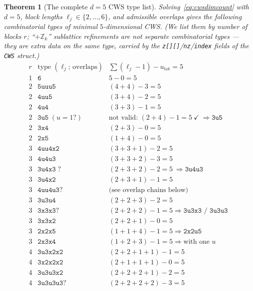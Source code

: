 \documentclass{amsart}
\newtheorem{theorem}{Theorem}[section]
\begin{document}
\begin{theorem}[The complete $d=5$ CWS type list]\label{thm:cws5types}
Solving~\eqref{eq:cwsdimcount} with $d=5$, block lengths
$\ell_j\in\{2,\dots,6\}$, and admissible overlaps gives the following
combinatorial types of minimal $5$-dimensional CWS. (We list them by number of
blocks $r$; ``$+\mathbb{Z}_k$'' sublattice refinements are \emph{not} separate
combinatorial types --- they are extra data on the same type, carried by the
\texttt{z[][]}/\texttt{nz}/\texttt{index} fields of the \texttt{CWS} struct.)
\[
\begin{array}{lll}
r & \text{type } (\ell_j;\,\text{overlaps}) & \sum(\ell_j{-}1)-u_{\mathrm{tot}}=5\\\hline
1 & \texttt{6}        & 5-0=5\\[2pt]
2 & \texttt{5uuu5}    & (4{+}4)-3=5\\
2 & \texttt{4uu5}     & (3{+}4)-2=5\\
2 & \texttt{4u4}      & (3{+}3)-1=5\\
2 & \texttt{3u5}\;(u{=}1?) & \text{not valid: }(2{+}4)-1=5\ \checkmark\ \Rightarrow \texttt{3u5}\\
2 & \texttt{3x4}      & (2{+}3)-0=5\\
2 & \texttt{2x5}      & (1{+}4)-0=5\\[2pt]
3 & \texttt{4uu4x2}   & (3{+}3{+}1)-2=5\\
3 & \texttt{4u4u3}    & (3{+}3{+}2)-3=5\\
3 & \texttt{3u4x3}\;? & (2{+}3{+}2)-2=5\ \Rightarrow \texttt{3u4u3}\\
3 & \texttt{3u4x2}    & (2{+}3{+}1)-1=5\\
3 & \texttt{4uu4u3?} & \text{(see overlap chains below)}\\
3 & \texttt{3u3u4}    & (2{+}2{+}3)-2=5\\
3 & \texttt{3x3x3}?   & (2{+}2{+}2)-1=5 \Rightarrow \texttt{3u3x3 / 3u3u3}\\
3 & \texttt{3x3x2}    & (2{+}2{+}1)-0=5\\
3 & \texttt{2x2x5}    & (1{+}1{+}4)-1=5 \Rightarrow \texttt{2x2u5}\\
3 & \texttt{2x3x4}    & (1{+}2{+}3)-1=5 \Rightarrow \text{with one }u\\[2pt]
4 & \texttt{3u3x2x2}  & (2{+}2{+}1{+}1)-1=5\\
4 & \texttt{3x2x2x2}  & (2{+}1{+}1{+}1)-0=5\\
4 & \texttt{3u3u3x2}  & (2{+}2{+}2{+}1)-2=5\\
4 & \texttt{3u3u3u3?} & (2{+}2{+}2{+}2)-3=5\\[2pt]

\end{array}\]
\end{theorem}
\end{document}
